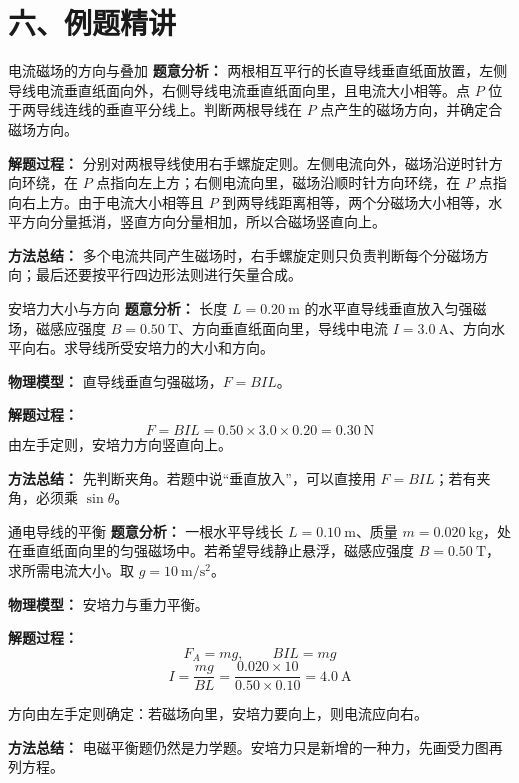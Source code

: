 \section*{六、例题精讲}

\begin{examplebox}{电流磁场的方向与叠加}
\textbf{题意分析：} 两根相互平行的长直导线垂直纸面放置，左侧导线电流垂直纸面向外，右侧导线电流垂直纸面向里，且电流大小相等。点 $P$ 位于两导线连线的垂直平分线上。判断两根导线在 $P$ 点产生的磁场方向，并确定合磁场方向。

\textbf{解题过程：} 分别对两根导线使用右手螺旋定则。左侧电流向外，磁场沿逆时针方向环绕，在 $P$ 点指向左上方；右侧电流向里，磁场沿顺时针方向环绕，在 $P$ 点指向右上方。由于电流大小相等且 $P$ 到两导线距离相等，两个分磁场大小相等，水平方向分量抵消，竖直方向分量相加，所以合磁场竖直向上。

\textbf{方法总结：} 多个电流共同产生磁场时，右手螺旋定则只负责判断每个分磁场方向；最后还要按平行四边形法则进行矢量合成。
\end{examplebox}

\begin{examplebox}{安培力大小与方向}
\textbf{题意分析：} 长度 $L=0.20\ \mathrm{m}$ 的水平直导线垂直放入匀强磁场，磁感应强度 $B=0.50\ \mathrm{T}$、方向垂直纸面向里，导线中电流 $I=3.0\ \mathrm{A}$、方向水平向右。求导线所受安培力的大小和方向。

\textbf{物理模型：} 直导线垂直匀强磁场，$F=BIL$。

\begin{center}

\end{center}

\textbf{解题过程：}
\[
F = BIL = 0.50 \times 3.0 \times 0.20 = 0.30\ \mathrm{N}
\]
由左手定则，安培力方向竖直向上。

\textbf{方法总结：} 先判断夹角。若题中说“垂直放入”，可以直接用 $F=BIL$；若有夹角，必须乘 $\sin\theta$。
\end{examplebox}

\begin{examplebox}{通电导线的平衡}
\textbf{题意分析：} 一根水平导线长 $L=0.10\ \mathrm{m}$、质量 $m=0.020\ \mathrm{kg}$，处在垂直纸面向里的匀强磁场中。若希望导线静止悬浮，磁感应强度 $B=0.50\ \mathrm{T}$，求所需电流大小。取 $g=10\ \mathrm{m/s^2}$。

\textbf{物理模型：} 安培力与重力平衡。

\begin{center}

\end{center}

\textbf{解题过程：}
\[
F_A = mg,\qquad BIL = mg
\]
\[
I = \frac{mg}{BL}
= \frac{0.020\times 10}{0.50\times 0.10}
=4.0\ \mathrm{A}
\]

方向由左手定则确定：若磁场向里，安培力要向上，则电流应向右。

\textbf{方法总结：} 电磁平衡题仍然是力学题。安培力只是新增的一种力，先画受力图再列方程。
\end{examplebox}

